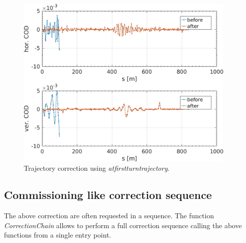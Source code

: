 \begin{figure}[!h]
	\centering
	\includegraphics[width=0.95\textwidth]{./images/corrections/TrajCor.jpg}
	\caption{Trajectory correction using \emph{atfirstturntrajectory}. }
	\label{fig:trajcor}
\end{figure}


\subsection{Commissioning like correction sequence}
The above correction are often requested in a sequence. The function \emph{CorrectionChain} allows to perform a full correction sequence calling the above functions from a single entry point. 

